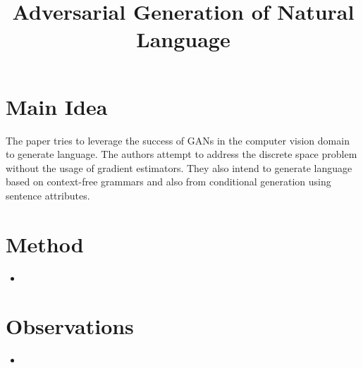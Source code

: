 \documentclass[12pt]{scrartcl}
\begin{document}
\title{Adversarial Generation of Natural Language}
\author{}
\date{}
\maketitle

\section{Main Idea}
The paper tries to leverage the success of GANs in the computer vision domain to generate language. The authors attempt to address the discrete space problem without the usage of gradient estimators. They also intend to generate language based on context-free grammars and also from conditional generation using sentence attributes. \cite{subramanian2017adversarial}

\section{Method}
  \begin{itemize}
    \item 
  \end{itemize}

\section{Observations}
  \begin{itemize}
    \item 
  \end{itemize}



\end{document}
